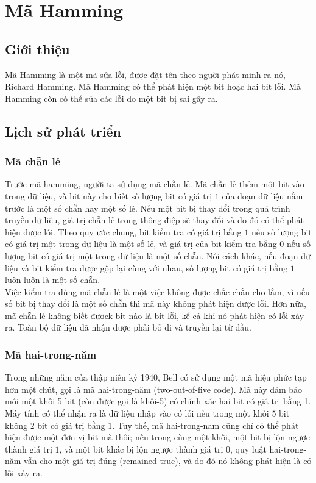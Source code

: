 \documentclass[12pt,a4paper]{article}
\begin{document}
\section{Mã Hamming}
\subsection{Giới thiệu}
Mã Hamming là một mã sửa lỗi, được đặt tên theo người phát minh ra nó, Richard Hamming. Mã Hamming có thể phát hiện một bit hoặc hai bit lỗi. Mã Hamming còn có thể sửa các lỗi do một bit bị sai gây ra.
\subsection{Lịch sử phát triển}
\subsubsection{Mã chẵn lẻ}

Trước mã hamming, người ta sử dụng mã chẵn lẻ. Mã chẵn lẻ thêm một bit vào trong dữ liệu, và bit này cho biết số lượng bit có giá trị $1$ của đoạn dữ liệu nằm trước là một số chẵn hay một số lẻ. Nếu một bit bị thay đổi trong quá trình truyền dữ liệu, giá trị chẵn lẻ trong thông điệp sẽ thay đổi và do đó có thể phát hiện được lỗi. Theo quy ước chung, bit kiểm tra có giá trị bằng $1$ nếu số lượng bit có giá trị một trong dữ liệu là một số lẻ, và giá trị của bit kiểm tra bằng $0$ nếu số lượng bit có giá trị một trong dữ liệu là một số chẵn. Nói cách khác, nếu đoạn dữ liệu và bit kiểm tra được gộp lại cùng với nhau, số lượng bit có giá trị bằng $1$ luôn luôn là một số chẵn.\\

Việc kiểm tra dùng mã chẵn lẻ là một việc không được chắc chắn cho lắm, vì nếu số bit bị thay đổi là một số chẵn thì mã này không phát hiện được lỗi. Hơn nữa, mã chẵn lẻ không biết đươck bit nào là bit lỗi, kể cả khi nó phát hiện có lỗi xảy ra. Toàn bộ dữ liệu đã nhận được phải bỏ đi và truyền lại từ đầu. 
\subsubsection{Mã hai-trong-năm}


Trong những năm của thập niên kỷ 1940, Bell có sử dụng một mã hiệu phức tạp hơn một chút, gọi là mã hai-trong-năm (two-out-of-five code). Mã này đảm bảo mỗi một khối 5 bit (còn được gọi là khối-5) có chính xác hai bit có giá trị bằng 1. Máy tính có thể nhận ra là dữ liệu nhập vào có lỗi nếu trong một khối $5$ bit không $2$ bit có giá trị bằng $1$. Tuy thế, mã hai-trong-năm cũng chỉ có thể phát hiện được một đơn vị bit mà thôi; nếu trong cùng một khối, một bit bị lộn ngược thành giá trị $1$, và một bit khác bị lộn ngược thành giá trị $0$, quy luật hai-trong-năm vẫn cho một giá trị đúng (remained true), và do đó nó không phát hiện là có lỗi xảy ra.
\end{document}
